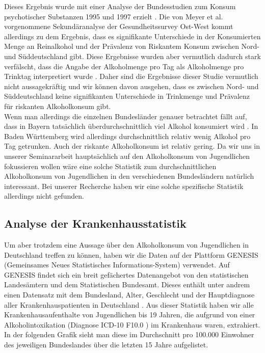 \documentclass[12pt]{article}
\begin{document}
Dieses Ergebnis wurde mit einer Analyse der Bundesstudien zum Konsum psychotischer Substanzen 1995 und 1997 erzielt \autocite[777]{kraus_einfluss_2001}. Die von Meyer et al. \autocite{meyer_regionale_1998} vorgenommene Sekundäranalyse der Gesundheitssurvey Ost-West kommt allerdings zu dem Ergebnis, dass es signifikante Unterschiede in der Konsumierten Menge an Reinalkohol und der Prävalenz von Riskantem Konsum zwischen Nord- und Süddeutschland gibt. Diese Ergebnisse wurden aber vermutlich dadurch stark verfälscht, dass die Angabe der Alkoholmenge pro Tag als Alkoholmenge pro Trinktag interpretiert wurde \autocite[781]{kraus_einfluss_2001}. Daher sind die Ergebnisse dieser Studie vermutlich nicht aussagekräftig und wir können davon ausgehen, dass es zwischen Nord- und Süddeutschland keine signifikanten Unterschiede in Trinkmenge und Prävalenz für riskanten Alkoholkonsum gibt.\\
Wenn man allerdings die einzelnen Bundesländer genauer betrachtet fällt auf, dass in Bayern tatsächlich überdurchschnittlich viel Alkohol konsumiert wird \autocite[778]{kraus_einfluss_2001}. In Baden Württemberg wird allerdings durchschnittlich relativ wenig Alkohol pro Tag getrunken. Auch der riskante Alkoholkonsum ist relativ gering. Da wir uns in unserer Seminararbeit hauptsächlich auf den Alkoholkonsum von Jugendlichen fokussieren wollen wäre eine solche Statistik zum durchschnittlichen Alkoholkonsum von Jugendlichen in den verschiedenen Bundesländern natürlich interessant. Bei unserer Recherche haben wir eine solche spezifische Statistik allerdings nicht gefunden.\\
\subsection{Analyse der Krankenhausstatistik}

Um aber trotzdem eine Aussage über den Alkoholkonsum von Jugendlichen in Deutschland treffen zu können, haben wir die Daten auf der Plattform GENESIS (Gemeinsames Neues Statistisches Informations-System) \autocite{noauthor_statistisches_nodate} verwendet. Auf GENESIS findet sich ein breit gefächertes Datenangebot von den statistischen Landesämtern und dem Statistischen Bundesamt. Dieses enthält unter andrem einen Datensatz mit dem Bundesland, Alter, Geschlecht und der Hauptdiagnose aller Krankenhauspatienten in Deutschland \autocite{noauthor_genesis_nodate}. Aus dieser Statistik haben wir alle Krankenhausaufenthalte von Jugendlichen bis 19 Jahren, die aufgrund von einer Alkoholintoxikation (Diagnose ICD-10 F10.0 \autocite{noauthor_icd-10-code_nodate}) im Krankenhaus waren, extrahiert. In der folgenden Grafik sieht man diese im Durchschnitt pro 100.000 Einwohner des jeweiligen Bundeslandes über die letzten 15 Jahre aufgelistet.
\end{document}
